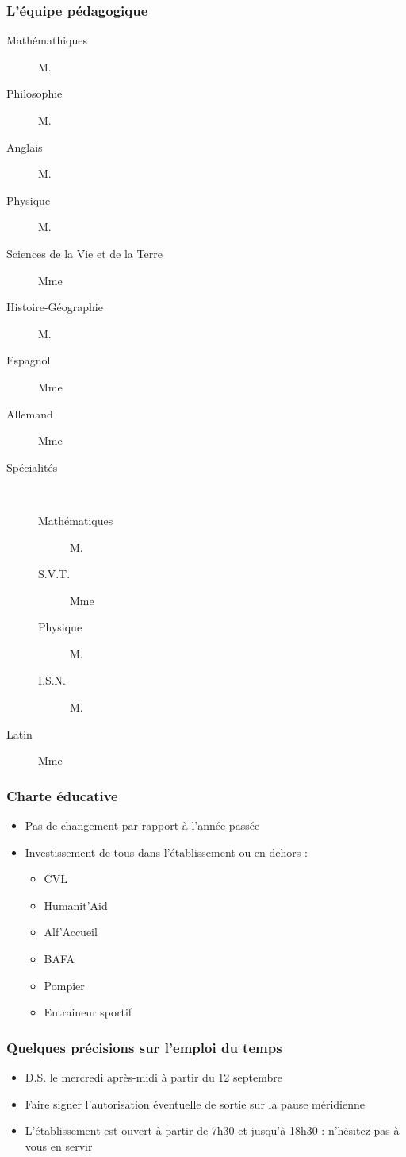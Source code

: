 \documentclass[frenchb]{beamer}
\begin{document}
\begin{frame}
  \frametitle{L'équipe pédagogique}
  \begin{description}
    \item[Mathémathiques] M. 
    \item[Philosophie] M. 
    \item[Anglais] M. 
    \item[Physique] M. 
    \item[Sciences de la Vie et de la Terre] Mme 
    \item[Histoire-Géographie] M. 
    \item[Espagnol] Mme 
    \item[Allemand] Mme 
    \item[Spécialités] ~
      \begin{description}
        \item[Mathématiques] M. 
        \item[S.V.T.] Mme 
        \item[Physique] M. 
        \item[I.S.N.] M. 
      \end{description}
    \item[Latin] Mme 
  \end{description}
\end{frame}

\begin{frame}
  \frametitle{Charte éducative}
  \begin{itemize}
    \item<1-> Pas de changement par rapport à l'année passée
    \item<2-> Investissement de tous dans l'établissement ou en dehors :
      \begin{itemize}
        \item CVL
        \item Humanit'Aid
        \item Alf'Accueil
        \item BAFA
        \item Pompier
        \item Entraineur sportif
      \end{itemize}
  \end{itemize}
\end{frame}

\begin{frame}
  \frametitle{Quelques précisions sur l'emploi du temps}
  \begin{itemize}[<+->]
    \item D.S. le mercredi après-midi à partir du 12 septembre
    \item Faire signer l'autorisation éventuelle de sortie sur la pause
      méridienne
    \item L'établissement est ouvert à partir de 7h30 et jusqu'à 18h30 :
      n'hésitez pas à vous en servir
  \end{itemize}
\end{frame}
\end{document}
